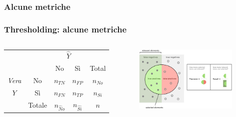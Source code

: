 \subsubsection[Alcune metriche]{Alcune metriche}
\begin{frame}
	\frametitle{Thresholding: alcune metriche}
	
	\begin{scriptsize}
	
	\begin{columns}
		\begin{center}
			\begin{tabular}{cc|cc|c}
				& & \multicolumn{2}{c|}{$\widehat Y$}\\
				& & No & Sì & Total \\
				\hline
				\emph{Vera} & No & $n_{TN}$ & $n_{FP}$ & $n_{No}$ \\
				$Y$ & Sì & $n_{FN}$ & $n_{TP}$ & $n_{Si}$ \\
				\hline
				& Totale & $n_{\widehat No}$ & $n_{\widehat{Si}}$ & $n$
			\end{tabular}
		\end{center}
			
		\begin{figure}[!htbp]
			\centering
			\includegraphics[width=0.8\linewidth]{images/supervised/z_algoritms_logistic_thresholding/PrecisionRecall.png}
		\end{figure}			
	\end{columns}


\end{scriptsize}
\end{frame}
